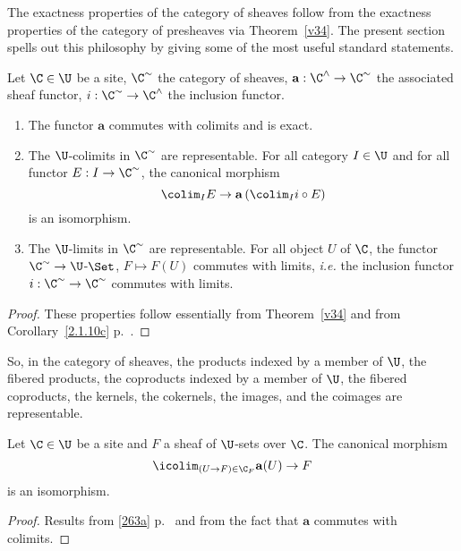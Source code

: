 \documentclass[12pt]{article}
\theoremstyle{remark}
\theoremstyle{definition}
\begin{document}
The exactness properties of the category of sheaves follow from the exactness properties of the category of presheaves via Theorem~\ref{v34}. The present section spells out this philosophy by giving some of the most useful standard statements.

\begin{thm}[Théorème 4.1]
Let $\C\in\U$ be a site, $\C^\sim$ the category of sheaves, $\mathbf a:\C^\wedge\to
\C^\sim$ the associated sheaf functor, $i:\C^\sim\to \C^\wedge$ the inclusion functor.
\begin{enumerate}%

\item The functor $\mathbf a$ commutes with colimits and is exact.

\item The $\U$-colimits in $\C^\sim$ are representable. For all category $I\in\U$ and for all functor $E:I\to\C^\sim$, the canonical morphism 
$$
\colim_I E\to\mathbf a\left(\colim_Ii\circ E\right)
$$
is an isomorphism.

\item The $\U$-limits in $\C^\sim$ are representable. For all object $U$ of $\C$, the functor $\C^\sim\to\U$-$\Set$, $F\mapsto F(U)$ commutes with limits, \emph{i.e.} the inclusion functor $i:\C^\sim\to\C^\sim$ commutes with limits.
\end{enumerate}
\end{thm}

\begin{proof}
These properties follow essentially from Theorem~\ref{v34} and from Corollary~\ref{2.1.10c} p.~\pageref{2.1.10c}.
\end{proof}

So, in the category of sheaves, the products indexed by a member of $\U$, the fibered products, the coproducts indexed by a member of $\U$, the fibered coproducts, the kernels,
the cokernels, the images, and the coimages are representable.

\begin{cor}[Corollaire 4.1.1]
Let $\C\in\U$ be a site and $F$ a sheaf of $\U$-sets over $\C$. The canonical morphism
$$
\icolim_{(U\to F)\in\C_F}\mathbf a(U)\to F
$$
is an isomorphism.
\end{cor}

\begin{proof}%
Results from \eqref{263a} p.~\pageref{263a} and from the fact that $\mathbf a$ commutes with colimits.
\end{proof}
\end{document}
